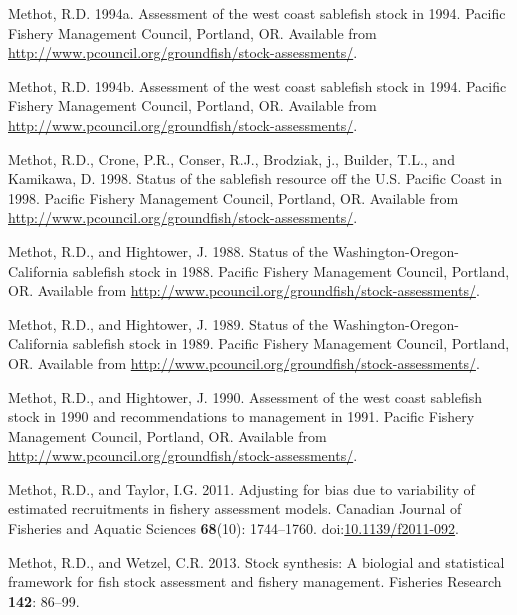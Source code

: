 \documentclass[
  english,
]{article}
\newlength{\cslhangindent}
\newenvironment{CSLReferences}[2] %
 {\begin{list}{}{%
  \setlength{\itemindent}{0pt}
  \setlength{\leftmargin}{0pt}
  \setlength{\parsep}{0pt}
  \ifodd #1
   \setlength{\leftmargin}{\cslhangindent}
   \setlength{\itemindent}{-1\cslhangindent}
  \fi
  \setlength{\itemsep}{#2\baselineskip}}}
 {\end{list}}
\begin{document}
\begin{CSLReferences}{1}{0}
Methot, R.D. 1994a. Assessment of the west coast sablefish stock in
1994. Pacific Fishery Management Council, Portland, OR. Available from
\url{http://www.pcouncil.org/groundfish/stock-assessments/}.

Methot, R.D. 1994b. Assessment of the west coast sablefish stock in
1994. Pacific Fishery Management Council, Portland, OR. Available from
\url{http://www.pcouncil.org/groundfish/stock-assessments/}.

Methot, R.D., Crone, P.R., Conser, R.J., Brodziak, j., Builder, T.L.,
and Kamikawa, D. 1998. Status of the sablefish resource off the {U}.{S}.
{P}acific {C}oast in 1998. Pacific Fishery Management Council, Portland,
OR. Available from
\url{http://www.pcouncil.org/groundfish/stock-assessments/}.

Methot, R.D., and Hightower, J. 1988. Status of the
{W}ashington-{O}regon-{C}alifornia sablefish stock in 1988. Pacific
Fishery Management Council, Portland, OR. Available from
\url{http://www.pcouncil.org/groundfish/stock-assessments/}.

Methot, R.D., and Hightower, J. 1989. Status of the
{W}ashington-{O}regon-{C}alifornia sablefish stock in 1989. Pacific
Fishery Management Council, Portland, OR. Available from
\url{http://www.pcouncil.org/groundfish/stock-assessments/}.

Methot, R.D., and Hightower, J. 1990. Assessment of the west coast
sablefish stock in 1990 and recommendations to management in 1991.
Pacific Fishery Management Council, Portland, OR. Available from
\url{http://www.pcouncil.org/groundfish/stock-assessments/}.

Methot, R.D., and Taylor, I.G. 2011. Adjusting for bias due to
variability of estimated recruitments in fishery assessment models.
Canadian Journal of Fisheries and Aquatic Sciences \textbf{68}(10):
1744--1760.
doi:\href{https://doi.org/10.1139/f2011-092}{10.1139/f2011-092}.

Methot, R.D., and Wetzel, C.R. 2013. Stock synthesis: A biologial and
statistical framework for fish stock assessment and fishery management.
Fisheries Research \textbf{142}: 86--99.


\end{CSLReferences}
\end{document}
